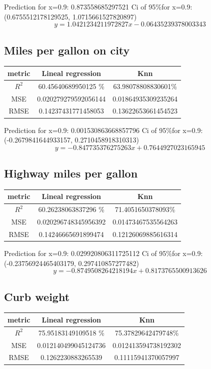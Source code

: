 \documentclass{article}
\begin{document}
Prediction for x=0.9: 0.873558685297521
Ci of  95\%for x=0.9: (0.6755512178129525, 1.0715661527820897)
$$y=1.0421234211972827x-0.06435239378003343$$
\subsection{Miles per gallon on city }
\begin{tabular}{|c|c|c|}
  \hline
   metric & Lineal regression & Knn \\ \hline
   $R^2$& 60.45640689950125 \%&63.98078808830601\%\\
   MSE&0.020279279592056144&0.01864935309235264\\
   RMSE&0.14237431771458053&0.13622653661454523\\
   \hline
  
\end{tabular}

Prediction for x=0.9: 0.001530863668857796
Ci of 95\%for x=0.9: (-0.2679841644933157, 0.2710458918310313)
$$y=-0.847735376275263x+0.7644927023165945$$
\subsection{Highway miles per gallon }
\begin{tabular}{|c|c|c|}
  \hline
   metric & Lineal regression & Knn \\ \hline
   $R^2$& 60.26238063837296 \%&71.4051650378093\%\\
   MSE&0.020296748345956392&0.01473467535564263\\
   RMSE&0.14246665691899474&0.12126069885616314\\
   \hline
  
\end{tabular}

Prediction for x=0.9: 0.029920806311725112
Ci of  95\%for x=0.9: (-0.23756924465403179, 0.297410857277482)
$$y=-0.8749508264218194x+0.8173765500913626$$
\subsection{Curb weight}
\begin{tabular}{|c|c|c|}
  \hline
   metric & Lineal regression & Knn \\ \hline
   $R^2$& 75.95183149109518 \%&75.37829642479748\%\\
   MSE&  0.012140499045124736& 0.012413594738192302\\
   RMSE&0.1262230883265539&0.11115941370057997\\
   \hline
\end{tabular}
\end{document}
